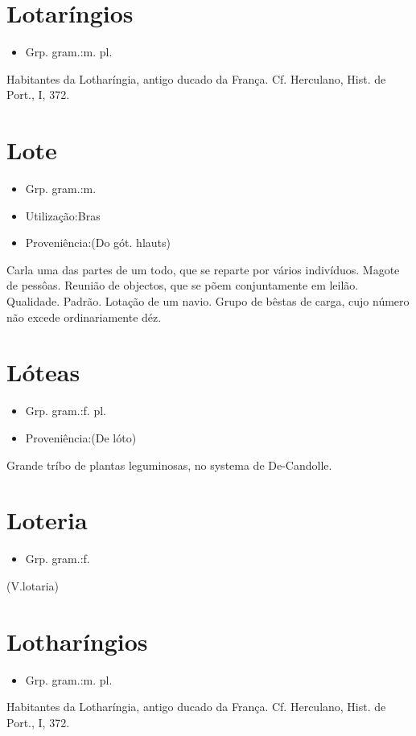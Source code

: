 \section{Lotaríngios}
\begin{itemize}
\item {Grp. gram.:m. pl.}
\end{itemize}
Habitantes da Lotharíngia, antigo ducado da França. Cf. Herculano, \textunderscore Hist. de Port.\textunderscore , I, 372.
\section{Lote}
\begin{itemize}
\item {Grp. gram.:m.}
\end{itemize}
\begin{itemize}
\item {Utilização:Bras}
\end{itemize}
\begin{itemize}
\item {Proveniência:(Do gót. \textunderscore hlauts\textunderscore )}
\end{itemize}
Carla uma das partes de um todo, que se reparte por vários indivíduos.
Magote de pessôas.
Reunião de objectos, que se põem conjuntamente em leilão.
Qualidade.
Padrão.
Lotação de um navio.
Grupo de bêstas de carga, cujo número não excede ordinariamente déz.
\section{Lóteas}
\begin{itemize}
\item {Grp. gram.:f. pl.}
\end{itemize}
\begin{itemize}
\item {Proveniência:(De \textunderscore lóto\textunderscore )}
\end{itemize}
Grande tríbo de plantas leguminosas, no systema de De-Candolle.
\section{Loteria}
\begin{itemize}
\item {Grp. gram.:f.}
\end{itemize}
(V.lotaria)
\section{Lotharíngios}
\begin{itemize}
\item {Grp. gram.:m. pl.}
\end{itemize}
Habitantes da Lotharíngia, antigo ducado da França. Cf. Herculano, \textunderscore Hist. de Port.\textunderscore , I, 372.
